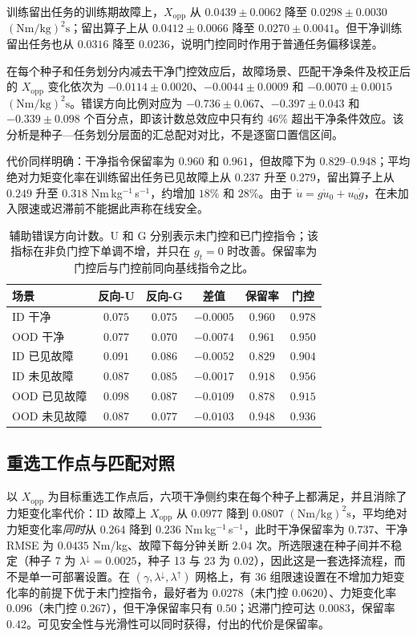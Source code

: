 \documentclass[UTF8]{ctexart}
\begin{document}
训练留出任务的训练期故障上，$X_{\mathrm{opp}}$ 从 $0.0439\pm0.0062$ 降至 $0.0298\pm0.0030$ $(\mathrm{Nm/kg})^2\mathrm{s}$；留出算子上从 $0.0412\pm0.0066$ 降至 $0.0270\pm0.0041$。但干净训练留出任务也从 $0.0316$ 降至 $0.0236$，说明门控同时作用于普通任务偏移误差。

在每个种子和任务划分内减去干净门控效应后，故障场景、匹配干净条件及校正后的 $X_{\mathrm{opp}}$ 变化依次为 $-0.0114\pm0.0020$、$-0.0044\pm0.0009$ 和 $-0.0070\pm0.0015$ $(\mathrm{Nm/kg})^2\mathrm{s}$。错误方向比例对应为 $-0.736\pm0.067$、$-0.397\pm0.043$ 和 $-0.339\pm0.098$ 个百分点，即该计数总效应中只有约 $46\%$ 超出干净条件效应。该分析是种子—任务划分层面的汇总配对对比，不是逐窗口置信区间。

代价同样明确：干净指令保留率为 $0.960$ 和 $0.961$，但故障下为 $0.829$--$0.948$；平均绝对力矩变化率在训练留出任务已见故障上从 $0.237$ 升至 $0.279$，留出算子上从 $0.249$ 升至 $0.318$ Nm\,kg$^{-1}$\,s$^{-1}$，约增加 $18\%$ 和 $28\%$。由于 $\dot u=g\dot u_0+u_0\dot g$，在未加入限速或迟滞前不能据此声称在线安全。

\begin{table}[t]
\centering
\small
\begin{tabular}{lccccc}
\toprule
场景 & 反向-U & 反向-G & 差值 & 保留率 & 门控 \\
\midrule
ID 干净 & $0.075$ & $0.075$ & $-0.0005$ & $0.960$ & $0.978$\\
OOD 干净 & $0.077$ & $0.070$ & $-0.0074$ & $0.961$ & $0.950$\\
ID 已见故障 & $0.091$ & $0.086$ & $-0.0052$ & $0.829$ & $0.904$\\
ID 未见故障 & $0.087$ & $0.085$ & $-0.0017$ & $0.918$ & $0.956$\\
OOD 已见故障 & $0.098$ & $0.087$ & $-0.0109$ & $0.878$ & $0.915$\\
OOD 未见故障 & $0.087$ & $0.077$ & $-0.0103$ & $0.948$ & $0.936$\\
\bottomrule
\end{tabular}
\caption{辅助错误方向计数。U 和 G 分别表示未门控和已门控指令；该指标在非负门控下单调不增，并只在 $g_t=0$ 时改善。保留率为门控后与门控前同向基线指令之比。}
\label{tab:safety-zh}
\end{table}

\subsection{重选工作点与匹配对照}

以 $X_{\mathrm{opp}}$ 为目标重选工作点后，六项干净侧约束在每个种子上都满足，并且消除了力矩变化率代价：ID 故障上 $X_{\mathrm{opp}}$ 从 $0.0977$ 降到 $0.0807$ $(\mathrm{Nm/kg})^2\mathrm{s}$，平均绝对力矩变化率\emph{同时}从 $0.264$ 降到 $0.236$ Nm\,kg$^{-1}$\,s$^{-1}$，此时干净保留率为 $0.737$、干净 RMSE 为 $0.0435$ Nm/kg、故障下每分钟关断 $2.04$ 次。所选限速在种子间并不稳定（种子 7 为 $\lambda^{\downarrow}=0.0025$，种子 13 与 23 为 $0.02$），因此这是一套选择流程，而不是单一可部署设置。在 $(\gamma,\lambda^{\downarrow},\lambda^{\uparrow})$ 网格上，有 $36$ 组限速设置在不增加力矩变化率的前提下优于未门控指令，最好者为 $0.0278$（未门控 $0.0620$）、力矩变化率 $0.096$（未门控 $0.267$），但干净保留率只有 $0.50$；迟滞门控可达 $0.0083$，保留率 $0.42$。可见安全性与光滑性可以同时获得，付出的代价是保留率。
\end{document}
